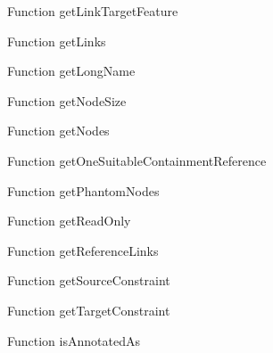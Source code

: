 \begin{minipage}[b]{0.5\textwidth}
\centering
{}
Function getLinkTargetFeature
\end{minipage}
\begin{minipage}[b]{0.5\textwidth}
\centering
{}
Function getLinks
\end{minipage}
\begin{minipage}[b]{0.5\textwidth}
\centering
{}
Function getLongName
\end{minipage}
\begin{minipage}[b]{0.5\textwidth}
\centering
{}
Function getNodeSize
\end{minipage}
\begin{minipage}[b]{0.5\textwidth}
\centering
{}
Function getNodes
\end{minipage}
\begin{minipage}[b]{0.5\textwidth}
\centering
{}
Function getOneSuitableContainmentReference
\end{minipage}
\begin{minipage}[b]{0.5\textwidth}
\centering
{}
Function getPhantomNodes
\end{minipage}
\begin{minipage}[b]{0.5\textwidth}
\centering
{}
Function getReadOnly
\end{minipage}
\begin{minipage}[b]{0.5\textwidth}
\centering
{}
Function getReferenceLinks
\end{minipage}
\begin{minipage}[b]{0.5\textwidth}
\centering
{}
Function getSourceConstraint
\end{minipage}
\begin{minipage}[b]{0.5\textwidth}
\centering
{}
Function getTargetConstraint
\end{minipage}
\begin{minipage}[b]{0.5\textwidth}
\centering
{}
Function isAnnotatedAs
\end{minipage}
